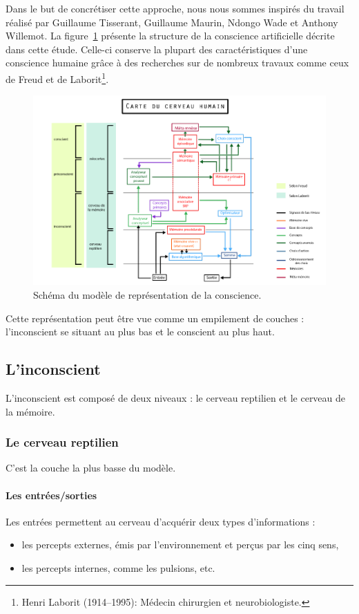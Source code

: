 Dans le but de concrétiser cette approche, nous nous sommes inspirés du travail réalisé par \mbox{Guillaume} \mbox{Tisserant}, \mbox{Guillaume} \mbox{Maurin}, \mbox{Ndongo} \mbox{Wade} et \mbox{Anthony} \mbox{Willemot}. La figure~\ref{modele_original} présente la structure de la conscience artificielle décrite dans cette étude. Celle-ci conserve la plupart des caractéristiques d’une conscience humaine grâce à des recherches sur de nombreux travaux comme ceux de Freud et de Laborit\footnote{Henri Laborit (1914--1995): Médecin chirurgien et neurobiologiste.}.

\begin{figure}[H] 
\centering
\includegraphics[width=\textwidth]{files/modele_original} 
\caption{Schéma du modèle de représentation de la conscience.} 
\label{modele_original}
\end{figure}

Cette représentation peut être vue comme un empilement de couches : l'inconscient se situant au plus bas et le conscient au plus haut.

\subsection{L'inconscient}
L'inconscient est composé de deux niveaux : le cerveau reptilien et le cerveau de la mémoire.

\subsubsection{Le cerveau reptilien}

C'est la couche la plus basse du modèle.

\paragraph{Les entrées/sorties}
Les entrées permettent au cerveau d'acquérir deux types d'informations :
\begin{itemize}
\item les percepts externes, émis par l'environnement et perçus par les cinq sens,
\item les percepts internes, comme les pulsions, etc. 
\end{itemize}


